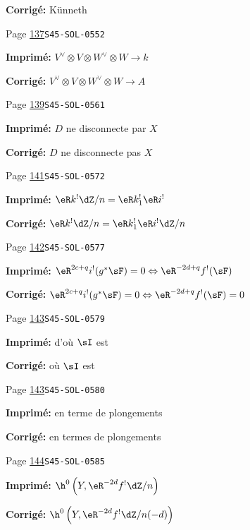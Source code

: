 \begin{description}
\par\noindent\textbf{Corrigé:} K\"unneth
\smallskip
\item[\hypertarget{apparatus:FR-0095}{95}] Page \hyperlink{printpage:fr:137}{137}\quad\texttt{S45-SOL-0552}
\par\noindent\textbf{Imprimé:} \(V^\vee\otimes V\otimes W^\vee\otimes W\to k\)
\par\noindent\textbf{Corrigé:} \(V^\vee\otimes V\otimes W^\vee\otimes W\to A\)
\smallskip
\item[\hypertarget{apparatus:FR-0096}{96}] Page \hyperlink{printpage:fr:139}{139}\quad\texttt{S45-SOL-0561}
\par\noindent\textbf{Imprimé:} $D$ ne disconnecte par $X$
\par\noindent\textbf{Corrigé:} $D$ ne disconnecte pas $X$
\smallskip
\item[\hypertarget{apparatus:FR-0097}{97}] Page \hyperlink{printpage:fr:141}{141}\quad\texttt{S45-SOL-0572}
\par\noindent\textbf{Imprimé:} \(\eR k^! \dZ/n=\eR k_1^! \eR i^!\)
\par\noindent\textbf{Corrigé:} \(\eR k^! \dZ/n=\eR k_1^! \eR i^!\dZ/n\)
\smallskip
\item[\hypertarget{apparatus:FR-0098}{98}] Page \hyperlink{printpage:fr:142}{142}\quad\texttt{S45-SOL-0577}
\par\noindent\textbf{Imprimé:} \(\eR^{2 c+q} i^!(g^*\sF)=0\Leftrightarrow \eR^{-2 d+q}f^!(\sF)\)
\par\noindent\textbf{Corrigé:} \(\eR^{2 c+q} i^!(g^*\sF)=0\Leftrightarrow \eR^{-2 d+q}f^!(\sF)=0\)
\smallskip
\item[\hypertarget{apparatus:FR-0099}{99}] Page \hyperlink{printpage:fr:143}{143}\quad\texttt{S45-SOL-0579}
\par\noindent\textbf{Imprimé:} d'où $\sI$ est
\par\noindent\textbf{Corrigé:} où $\sI$ est
\smallskip
\item[\hypertarget{apparatus:FR-0100}{100}] Page \hyperlink{printpage:fr:143}{143}\quad\texttt{S45-SOL-0580}
\par\noindent\textbf{Imprimé:} en terme de plongements
\par\noindent\textbf{Corrigé:} en termes de plongements
\smallskip
\item[\hypertarget{apparatus:FR-0101}{101}] Page \hyperlink{printpage:fr:144}{144}\quad\texttt{S45-SOL-0585}
\par\noindent\textbf{Imprimé:} \(\h^0\left(Y,\eR^{-2 d}f^!\dZ/n\right)\)
\par\noindent\textbf{Corrigé:} \(\h^0\left(Y,\eR^{-2 d}f^!\dZ/n(-d)\right)\)

\end{description}
